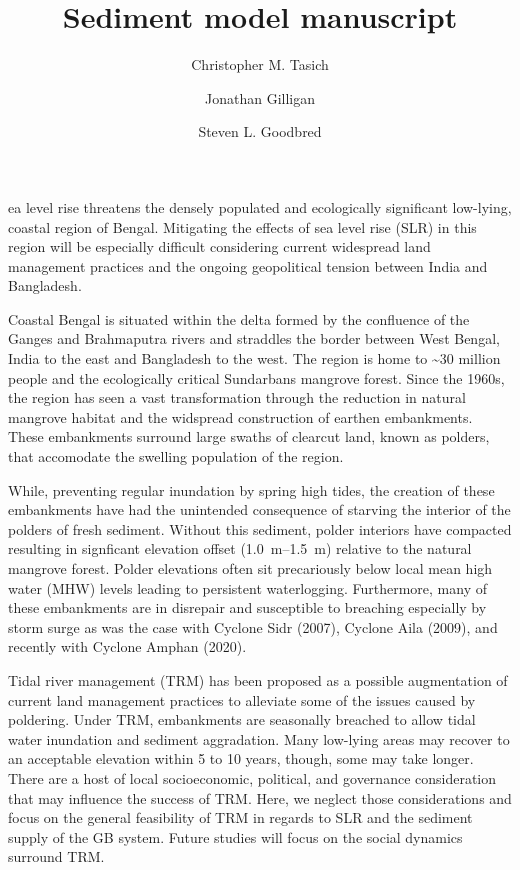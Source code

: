 \documentclass[9pt,twocolumn,twoside,lineno]{pnas-new}
\title{Sediment model manuscript}
\author[a,1]{Christopher M. Tasich}
\author[a,2]{Jonathan Gilligan}
\author[a,3]{Steven L. Goodbred}
\affil[a]{Vanderbilt University}
\begin{document}
\maketitle
\thispagestyle{firststyle}

ea level rise threatens the densely populated and ecologically significant low-lying, coastal region of Bengal. Mitigating the effects of sea level rise (SLR) in this region will be especially difficult considering current widespread land management practices and the ongoing geopolitical tension between India and Bangladesh.

Coastal Bengal is situated within the delta formed by the confluence of the Ganges and Brahmaputra rivers and straddles the border between West Bengal, India to the east and Bangladesh to the west. The region is home to \textasciitilde30 million people\cite{centerforinternationalearthscienceinformationnetwork-ciesin-columbiauniversityPopulationEstimationService2018} and the ecologically critical Sundarbans mangrove forest. Since the 1960s, the region has seen a vast transformation through the reduction in natural mangrove habitat and the widspread construction of earthen embankments. These embankments surround large swaths of clearcut land, known as polders, that accomodate the swelling population of the region.

While, preventing regular inundation by spring high tides, the creation of these embankments have had the unintended consequence of starving the interior of the polders of fresh sediment. Without this sediment, polder interiors have compacted resulting in signficant elevation offset (\SIrange{1.0}{1.5}{\meter}) relative to the natural mangrove forest\cite{auerbachFloodRiskNatural2015}. Polder elevations often sit precariously below local mean high water (MHW) levels leading to persistent waterlogging. Furthermore, many of these embankments are in disrepair and susceptible to breaching especially by storm surge as was the case with Cyclone Sidr (2007), Cyclone Aila (2009), and recently with Cyclone Amphan (2020).

Tidal river management (TRM) has been proposed as a possible augmentation of current land management practices to alleviate some of the issues caused by poldering. Under TRM, embankments are seasonally breached to allow tidal water inundation and sediment aggradation. Many low-lying areas may recover to an acceptable elevation within 5 to 10 years, though, some may take longer. There are a host of local socioeconomic, political, and governance consideration that may influence the success of TRM. Here, we neglect those considerations and focus on the general feasibility of TRM in regards to SLR and the sediment supply of the GB system. Future studies will focus on the social dynamics surround TRM.
\end{document}
